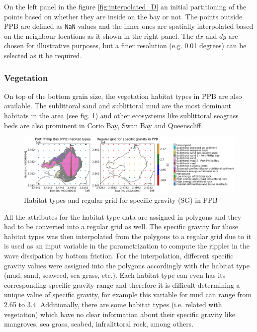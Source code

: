 \documentclass[12pt]{article}
\begin{document}
On the left panel in the figure \ref{fig:interpolated_D} an initial partitioning of the points based on whether they are inside on the bay or not. The points outside PPB are defined as \verb|NaN| values and the inner ones are spatially interpolated based on the neighbour locations as it shown in the right panel. The $dx$ and $dy$ are chosen for illustrative purposes, but a finer resolution (e.g. 0.01 degrees) can be selected as it be required.

\subsubsection*{Vegetation}

On top of the bottom grain size, the vegetation habitat types in PPB are also available. The sublittoral sand and sublittoral mud are the most dominant habitats in the area (see fig. \ref{fig:sg_PPB}) and other ecosystems like sublittoral seagrass beds are also prominent in Corio Bay, Swan Bay and Queenscliff.

\begin{figure}[h]
    \centering
    \includegraphics[scale=0.4]{plots/maps/PPB_habitat_types_0.1_0.1.png}
    \caption{Habitat types and regular grid for specific gravity (SG) in PPB}
    \label{fig:sg_PPB}
\end{figure}

All the attributes for the habitat type data are assigned in polygons and they had to be converted into a regular grid as well. The specific gravity for those habitat types was then interpolated from the polygons to a regular grid due to it is used as an input variable in the \textcite{Smith2011} parametrization to compute the ripples in the wave dissipation by bottom friction. For the interpolation, different specific gravity values were assigned into the polygons accordingly with the habitat type (mud, sand, seaweed, sea grass, etc.). Each habitat type can even has its corresponding specific gravity range and therefore it is difficult determining a unique value of specific gravity, for example this variable for mud can range from 2.65 to 3.4. Additionally, there are some habitat types (i.e. related with vegetation) which have no clear information about their specific gravity like mangroves, sea grass, seabed, infralittoral rock, among others.\\
\end{document}
